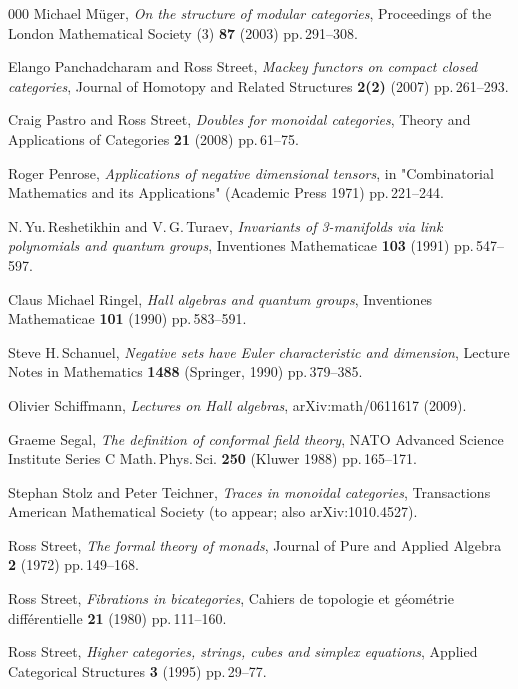 \documentclass[a4paper,12pt]{article}
\theoremstyle{definition}
\theoremstyle{fact}
\theoremstyle{genquest}
\theoremstyle{step}
\begin{document}
\begin{thebibliography}{000}
 Michael M\"uger, \textit{On the structure of modular categories}, Proceedings of the London Mathematical Society (3) \textbf{87} (2003) pp.\,291--308.

 Elango Panchadcharam and Ross Street, \textit{Mackey functors on compact closed categories}, Journal of Homotopy and Related Structures \textbf{2(2)} (2007) pp.\,261--293.

 Craig Pastro and Ross Street, \textit{Doubles for monoidal categories}, Theory and Applications of Categories \textbf{21} (2008) pp.\,61--75.

 Roger Penrose, \textit{Applications of negative dimensional tensors}, in "Combinatorial Mathematics and its Applications" (Academic Press 1971) pp.\,221--244. 

 N.\,Yu.\,Reshetikhin and V.\,G.\,Turaev, \textit{Invariants of 3-manifolds via link polynomials and quantum groups}, Inventiones Mathematicae \textbf{103} (1991) pp.\,547--597.

 Claus Michael Ringel, \textit{Hall algebras and quantum groups}, Inventiones Mathematicae \textbf{101} (1990) pp.\,583--591.

 Steve H.\,Schanuel, \textit{Negative sets have Euler characteristic and dimension}, Lecture Notes in Mathematics \textbf{1488} (Springer, 1990) pp.\,379--385.

 Olivier Schiffmann, \textit{Lectures on Hall algebras}, arXiv:math/0611617 (2009). 

 Graeme Segal, \textit{The definition of conformal field theory}, NATO Advanced Science Institute Series C Math.\,Phys.\,Sci. \textbf{250} (Kluwer 1988) pp.\,165--171.

 Stephan Stolz and Peter Teichner, \textit{Traces in monoidal categories}, Transactions American Mathematical Society (to appear; also arXiv:1010.4527).

 Ross Street, \textit{The formal theory of monads}, Journal of Pure and Applied Algebra \textbf{2} (1972) pp.\,149--168. 

 Ross Street, \textit{Fibrations in bicategories}, Cahiers de topologie et g\'eom\'etrie diff\'erentielle \textbf{21} (1980) pp.\,111--160.

 Ross Street, \textit{Higher categories, strings, cubes and simplex equations}, Applied Categorical Structures \textbf{3} (1995) pp.\,29--77.


\end{thebibliography}
\end{document}
